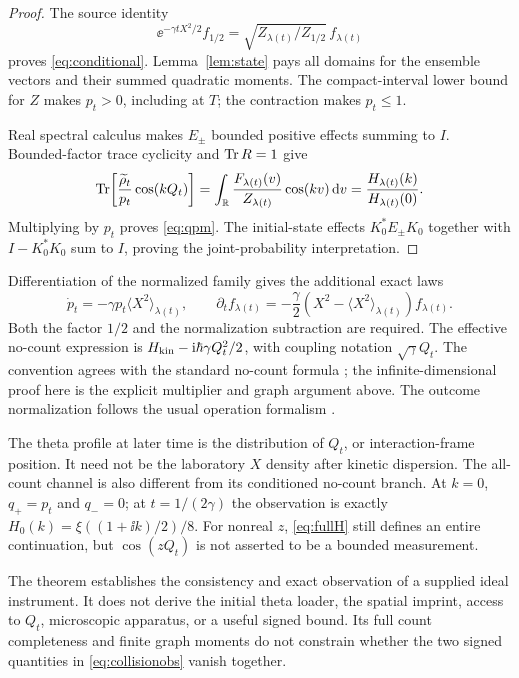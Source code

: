 \begin{proof}
The source identity
\[
 \ee^{-\gamma tX^2/2}f_{1/2}
 =\sqrt{Z_{\lambda(t)}/Z_{1/2}}\,f_{\lambda(t)}
\]
proves \eqref{eq:conditional}. Lemma~\ref{lem:state} pays all domains
for the ensemble vectors and their summed quadratic moments.
The compact-interval lower bound for $Z$ makes $p_t>0$, including at
$T$; the contraction makes $p_t\le1$.

Real spectral calculus makes $E_\pm$ bounded positive effects summing
to $I$. Bounded-factor trace cyclicity and $\operatorname{Tr} R=1$ give
\[
 \operatorname{Tr}\!\left[\frac{\widetilde\rho_t}{p_t}\cos(kQ_t)\right]
 =\int_\mathbb R\frac{F_{\lambda(t)}(v)}{Z_{\lambda(t)}}\cos(kv)\,\mathrm d v
 =\frac{H_{\lambda(t)}(k)}{H_{\lambda(t)}(0)}.
\]
Multiplying by $p_t$ proves \eqref{eq:qpm}.
The initial-state effects $K_0^*E_\pm K_0$ together with
$I-K_0^*K_0$ sum to $I$, proving the joint-probability interpretation.
\end{proof}

Differentiation of the normalized family gives the additional exact laws
\begin{equation}\label{eq:directtangents}
 \dot p_t=-\gamma p_t\langle X^2\rangle_{\lambda(t)},\qquad
 \partial_tf_{\lambda(t)}
 =-\frac\gamma2(X^2-\langle X^2\rangle_{\lambda(t)})f_{\lambda(t)}.
\end{equation}
Both the factor $1/2$ and the normalization subtraction are required.
The effective no-count expression is
$H_{\rm kin}-\mathrm i\hbar\gamma Q_t^2/2$, with coupling notation
$\sqrt\gamma Q_t$. The convention agrees with the standard no-count
formula \cite[Section 1, (4)--(11)]{CastinDalibardMolmer2008v1}; the
infinite-dimensional proof here is the explicit multiplier and graph
argument above. The outcome normalization follows the usual operation
formalism \cite[Section III, (17)--(19)]{JacobsSteck2006v1}.

The theta profile at later time is the distribution of $Q_t$, or
interaction-frame position. It need not be the laboratory $X$ density
after kinetic dispersion. The all-count channel is also different from
its conditioned no-count branch. At $k=0$, $q_+=p_t$ and $q_-=0$;
at $t=1/(2\gamma)$ the observation is exactly $H_0(k)=\xi((1+\ii k)/2)/8$.
For nonreal $z$, \eqref{eq:fullH} still defines an entire continuation,
but $\cos(zQ_t)$ is not asserted to be a bounded measurement.

The theorem establishes the consistency and exact observation of a
supplied ideal instrument. It does not derive the initial theta loader,
the spatial imprint, access to $Q_t$, microscopic apparatus, or a useful
signed bound. Its full count completeness and finite graph moments do
not constrain whether the two signed quantities in
\eqref{eq:collisionobs} vanish together.
